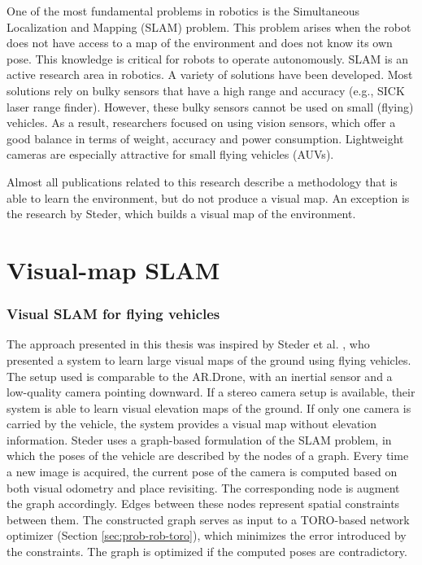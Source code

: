 One of the most fundamental problems in robotics is the Simultaneous Localization and Mapping (SLAM) problem.
This problem arises when the robot does not have access to a map of the environment and does not know its own pose. 
This knowledge is critical for robots to operate autonomously.
SLAM is an active research area in robotics.
A variety of solutions have been developed.
Most solutions rely on bulky sensors that have a high range and accuracy (e.g., SICK laser range finder).
However, these bulky sensors cannot be used on small (flying) vehicles.
As a result, researchers focused on using vision sensors, which offer a good balance in terms of weight, accuracy and power consumption.
Lightweight cameras are especially attractive for small flying vehicles (AUVs).

Almost all publications related to this research describe a methodology that is able to learn the environment, but do not produce a visual map.
An exception is the research by Steder, which builds a visual map of the environment.


\section{Visual-map SLAM}

\subsubsection{Visual SLAM for flying vehicles}
The approach presented in this thesis was inspired by Steder et al. \cite{steder2008visual}, who presented a system to learn large visual maps of the ground using flying vehicles.
The setup used is comparable to the AR.Drone, with an inertial sensor and a low-quality camera pointing downward.
If a stereo camera setup is available, their system is able to learn visual elevation maps of the ground.
If only one camera is carried by the vehicle, the system provides a visual map without elevation information.
Steder uses a graph-based formulation of the SLAM problem, in which the poses of the vehicle are described by the nodes of a graph.
Every time a new image is acquired, the current pose of the camera is computed based on both visual odometry and place revisiting.
The corresponding node is augment the graph accordingly.
Edges between these nodes represent spatial constraints between them.
The constructed graph serves as input to a TORO-based network optimizer (Section \ref{sec:prob-rob-toro}), which minimizes the error introduced by the constraints.
The graph is optimized if the computed poses are contradictory.

